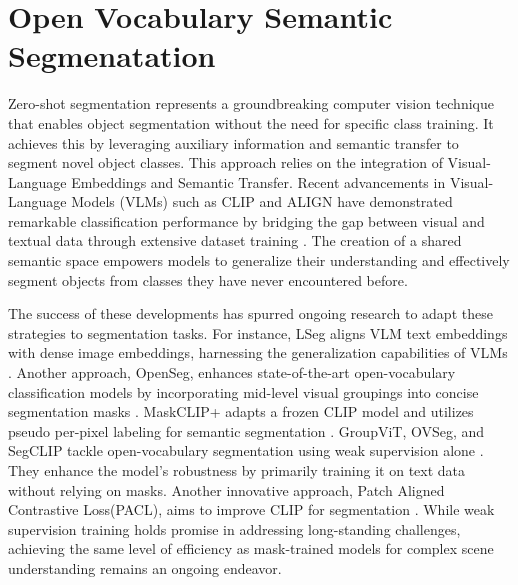 \section{Open Vocabulary Semantic Segmenatation}
Zero-shot segmentation represents a groundbreaking computer vision technique that enables object segmentation without the need for specific class training. It achieves this by leveraging auxiliary information and semantic transfer to segment novel object classes. This approach relies on the integration of Visual-Language Embeddings and Semantic Transfer. Recent advancements in Visual-Language Models (VLMs) such as CLIP and ALIGN have demonstrated remarkable classification performance by bridging the gap between visual and textual data through extensive dataset training \cite{radford2021learning, jia2021scaling}. The creation of a shared semantic space empowers models to generalize their understanding and effectively segment objects from classes they have never encountered before.

The success of these developments has spurred ongoing research to adapt these strategies to segmentation tasks. For instance, LSeg aligns VLM text embeddings with dense image embeddings, harnessing the generalization capabilities of VLMs \cite{Li2022LanguagedrivenSS}. Another approach, OpenSeg, enhances state-of-the-art open-vocabulary classification models by incorporating mid-level visual groupings into concise segmentation masks \cite{ghiasi2022scaling}. MaskCLIP+ adapts a frozen CLIP model and utilizes pseudo per-pixel labeling for semantic segmentation \cite{zhou2022extract}. GroupViT, OVSeg, and SegCLIP tackle open-vocabulary segmentation using weak supervision alone \cite{xu2022groupvit, liang2023open, luo2023segclip}. They enhance the model's robustness by primarily training it on text data without relying on masks. Another innovative approach, Patch Aligned Contrastive Loss(PACL), aims to improve CLIP for segmentation \cite{mukhoti2023open}. While weak supervision training holds promise in addressing long-standing challenges, achieving the same level of efficiency as mask-trained models for complex scene understanding remains an ongoing endeavor.

